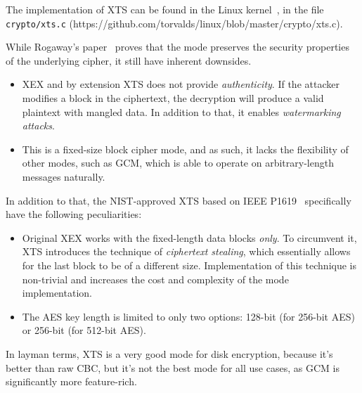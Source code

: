 The implementation of XTS can be found in the Linux kernel~\cite{linux-kernel}, in the file \texttt{crypto/xts.c} (https://github.com/torvalds/linux/blob/master/crypto/xts.c).

While Rogaway's paper~\cite{Rogaway} proves that the mode preserves the security properties of the underlying cipher, it still have inherent downsides.

\begin{itemize}
    \item XEX and by extension XTS does not provide \textit{authenticity}. If the attacker modifies a block in the ciphertext, the decryption will produce a valid plaintext with mangled data. In addition to that, it enables \textit{watermarking attacks}.
    \item This is a fixed-size block cipher mode, and as such, it lacks the flexibility of other modes, such as GCM, which is able to operate on arbitrary-length messages naturally.
\end{itemize}

In addition to that, the NIST-approved XTS based on IEEE P1619~\cite{IEEE1619} specifically have the following peculiarities:
\begin{itemize}
    \item Original XEX works with the fixed-length data blocks \textit{only}.
    To circumvent it, XTS introduces the technique of \textit{ciphertext stealing}, which essentially allows for the last block to be of a different size.
    Implementation of this technique is non-trivial and increases the cost and complexity of the mode implementation.
    \item The AES key length is limited to only two options: 128-bit (for 256-bit AES) or 256-bit (for 512-bit AES).
\end{itemize}

In layman terms, XTS is a very good mode for disk encryption, because it's better than raw CBC, but it's not the best mode for all use cases, as GCM is significantly more feature-rich.
